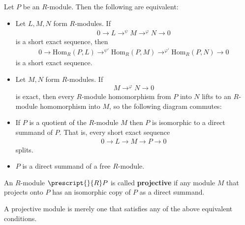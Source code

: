 \documentclass{memoir}
\begin{document}
\begin{prop}
	Let \(P\) be an \(R\)-module. Then the following are equivalent:
	\begin{itemize}
		\item Let \(L,M,N\) form \(R\)-modules. If
			\begin{align*}
				0 \to L \to^{\psi }M \to^{\varphi }N \to 0
			\end{align*}
			is a short exact sequence, then
			\begin{align*}
				0 \to \textrm{Hom}_R(P,L) \to^{\psi '} \textrm{Hom}_R(P,M) \to^{\varphi '} \textrm{Hom}_R(P,N) \to 0
			\end{align*}
			is a short exact sequence.
		\item Let \(M,N\) form \(R\)-modules. If
			 \begin{align*}
				M \to^{\varphi }N \to 0
			\end{align*}
			is exact, then every \(R\)-module homomorphism from \(P\) into \(N\) lifts to an \(R\)-module homomorphism into \(M\), so the following diagram commutes:
\begin{center}
\end{center}
	\item If \(P\) is a quotient of the \(R\)-module \(M\) then \(P\) is isomorphic to a direct summand of \(P\). That is, every short exact sequence
		\begin{align*}
			0\to L \to M\to P\to 0
		\end{align*}
		splits.
	\item \(P\) is a direct summand of a free \(R\)-module.
	\end{itemize}
\end{prop}

\begin{defn}
	An \(R\)-module \(\prescript{}{R}P\) is called \textbf{projective} if any module \(M\) that projects onto \(P\) has an isomorphic copy of \(P\) as a direct summand.
\end{defn}
A projective module is merely one that satisfies any of the above equivalent conditions.
\end{document}
